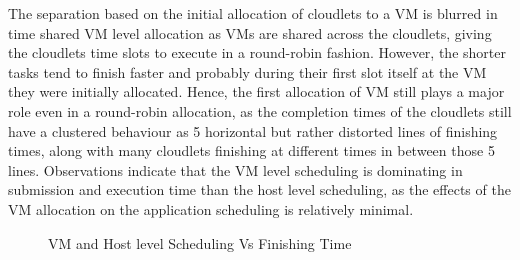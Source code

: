 \documentclass{llncs}
\begin{document}
The separation based on the initial allocation of cloudlets to a VM is blurred in time shared VM level allocation as VMs are shared across the cloudlets, giving the cloudlets time slots to execute in a round-robin fashion. However, the shorter tasks tend to finish faster and probably during their first slot itself at the VM they were initially allocated. Hence, the first allocation of VM still plays a major role even in a round-robin allocation, as the completion times of the cloudlets still have a clustered behaviour as 5 horizontal but rather distorted lines of finishing times, along with many cloudlets finishing at different times in between those 5 lines. Observations indicate that the VM level scheduling is dominating in submission and execution time than the host level scheduling, as the effects of the VM allocation on the application scheduling is relatively minimal.
\begin{figure}[ht]
 \caption{VM and Host level Scheduling Vs Finishing Time}
 \label{fig:finish}
\end{figure}
\end{document}
